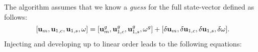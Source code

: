 \documentclass[twocolumn,10pt]{asme2ej}
\begin{document}
The algorithm assumes that we know a {\em guess} for the full state-vector defined as follows:
$$
[{\bf u }_m, {\bf u }_{1,c}, {\bf u }_{1,s}, \omega] = 
 [{\bf u }_m^g, {\bf u }_{1,c}^g, {\bf u }_{1,s}^g, \omega^g]
+ [\delta {\bf u }_m, \delta {\bf u }_{1,c}, \delta {\bf u }_{1,s}, \delta \omega].
$$
Injecting and developing up to linear order leads to the following equations:
\iffalse
\begin{subequations}\label{eq:harmonic_total}
\begin{eqnarray}
\begin{split}
&{\cal NS}(  {\bf u }_m^g ) - \frac{1}{4} \big[ {\cal C}( {\bf u }_{1,c}^g,{\bf u }_{1,c}^g) +  {\cal C}( {\bf u }_{1,s}^g,{\bf u }_{1,s}^g) \big]+ {\cal LNS}_{{\bf u }_m^g}(\delta {\bf u }_m)
\\
&-\frac{1}{2} \big[ {\cal C}( {\bf u }_{1,c}^g,\delta {\bf u }_{1,c}) +  {\cal C}( {\bf u }_{1,s}^g,\delta {\bf u }_{1,s}) \big] = 0,
\end{split}
\label{HB_1}
\\
\begin{split}
{\cal LNS}_{{\bf u }_m^g}( {\bf u }_{1,c}^g) - \omega^g {\bf u }_{1,s}^g& -  {\cal C}( \delta {\bf u }_{m}, {\bf u }_{1,c}^g)
\\
&+{\cal LNS}_{{\bf u }_m^g}( \delta {\bf u }_{1,c})  - \omega^g \delta {\bf u }_{1,s}  
 - \delta \omega {\bf u }_{1,s}^g = 0 ,
 \end{split}
\label{HB_2}
\\
\begin{split}
{\cal LNS}_{{\bf u }_m^g}({\bf u }_{1,s}^g) + \omega^g {\bf u }_{1,c}^g& -  {\cal C}( \delta {\bf u }_{m}, {\bf u }_{1,s}^g)
\\
&+{\cal LNS}_{{\bf u }_m^g}( \delta {\bf u }_{1,s}) + \omega^g \delta {\bf u }_{1,c} +  \delta \omega {\bf u }_{1,c}^g= 0 ,
\end{split}
\label{HB_3}
\\
\begin{split}
 F_y({\bf u }_{1,s}^g) + F_y(\delta {\bf u }_{1,s}) = 0. \qquad \qquad \qquad \qquad \qquad \qquad \quad
\end{split}
\end{eqnarray}
\end{subequations}
\fi
\end{document}
